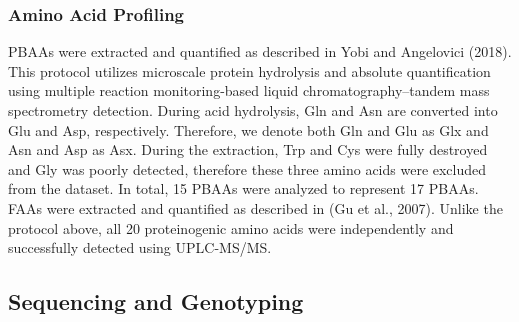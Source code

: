 \documentclass[pdflatex,sn-mathphys-num]{sn-jnl}%
\theoremstyle{thmstyleone}%
\theoremstyle{thmstyletwo}%
\theoremstyle{thmstylethree}%
\begin{document}
\subsubsection{Amino Acid Profiling}
PBAAs were extracted and quantified as described in Yobi and Angelovici (2018). This protocol utilizes microscale protein hydrolysis and absolute quantification using multiple reaction monitoring-based liquid chromatography–tandem mass spectrometry detection. During acid hydrolysis, Gln and Asn are converted into Glu and Asp, respectively. Therefore, we denote both Gln and Glu as Glx and Asn and Asp as Asx. During the extraction, Trp and Cys were fully destroyed and Gly was poorly detected, therefore these three amino acids were excluded from the dataset. In total, 15 PBAAs were analyzed to represent 17 PBAAs. FAAs were extracted and quantified as described in (Gu et al., 2007). Unlike the protocol above, all 20 proteinogenic amino acids were independently and successfully detected using UPLC-MS/MS.


\subsection{Sequencing and Genotyping}
\end{document}

